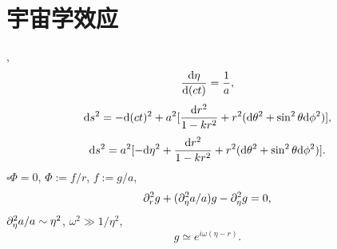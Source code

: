 \chapter{宇宙学效应}

\cite{Maggiore2014},
\begin{equation}
    \frac{\mathrm{d}\eta}{\mathrm{d}(ct)}=\frac{1}{a},
\end{equation}
\begin{equation}
    \mathrm{d} s^2=-\mathrm{d}(ct)^2+a^2[\frac{\mathrm{d} r^2}{1-kr^2}+r^2(\mathrm{d}\theta^2+\sin^2\theta\mathrm{d}\phi^2)],
\end{equation}
\begin{equation}
    \mathrm{d} s^2=a^2[-\mathrm{d}\eta^2+\frac{\mathrm{d} r^2}{1-kr^2}+r^2(\mathrm{d}\theta^2+\sin^2\theta\mathrm{d}\phi^2)].
\end{equation}
$\square\Phi=0$, $\Phi:=f/r$, $f:=g/a$,
\begin{equation}
    \partial_r^2g+(\partial_\eta^2a/a)g-\partial_\eta^2g=0,
\end{equation}
$\partial_\eta^2a/a\sim\eta^2$, $\omega^2\gg1/\eta^2$,
\begin{equation}
    g\simeq e^{i\omega(\eta-r)}.
\end{equation}
